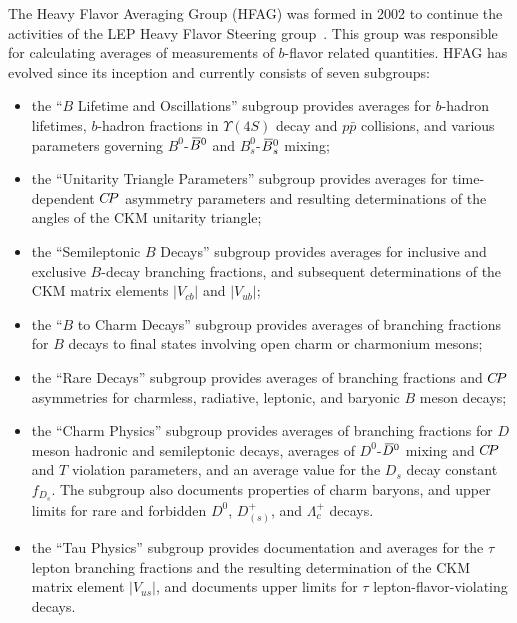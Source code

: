 The Heavy Flavor Averaging Group (HFAG) was formed in 2002 to 
continue the activities of the LEP Heavy Flavor Steering 
group~\cite{Abbaneo:2000ej_mod,*Abbaneo:2001bv_mod_cont}. 
This group was responsible for calculating averages of 
measurements of $b$-flavor related quantities. HFAG has evolved 
since its inception and currently consists of seven subgroups:
% 
\begin{itemize}
\item the ``$B$ Lifetime and Oscillations'' subgroup provides 
averages for $b$-hadron lifetimes, $b$-hadron fractions in 
$\Upsilon(4S)$ decay and $p\bar{p}$ collisions, and various 
parameters governing $B^0$-$\kern 0.18em\overline{\kern -0.18em B}{}^0$ and $B_s^0$-$\kern 0.18em\overline{\kern -0.18em B}{}_s^0$ mixing;

\item the ``Unitarity Triangle Parameters'' subgroup provides
averages for time-dependent $C\!P$ asymmetry parameters and 
resulting determinations of the angles of the CKM unitarity triangle;

\item the ``Semileptonic $B$ Decays'' subgroup provides averages
for inclusive and exclusive $B$-decay branching fractions, and
subsequent determinations of the CKM matrix elements 
$|V_{cb}|$ and $|V_{ub}|$;

\item the ``$B$ to Charm Decays'' subgroup provides averages of 
branching fractions for $B$ decays to final states involving open 
charm or charmonium mesons;

\item the ``Rare Decays'' subgroup provides averages of branching 
fractions and $C\!P$ asymmetries for charmless, radiative, 
leptonic, and baryonic $B$ meson decays;

\item the ``Charm Physics'' subgroup provides averages of branching 
fractions for $D$ meson hadronic and semileptonic decays, 
averages of $D^0$-$\kern 0.2em\overline{\kern -0.2em D}{}^0$ mixing and $C\!P$ and $T$ violation parameters, 
and an average value for the $D^{}_s$ decay constant~$f^{}_{D_s}$.
The subgroup also documents properties of charm baryons, and upper 
limits for rare and forbidden $D^0$, $D^+_{(s)}$, and $\Lambda_c^+$ 
decays.

\item the ``Tau Physics'' subgroup provides documentation and
averages for the $\tau$ lepton branching fractions
and the resulting determination of the CKM matrix element $|V_{us}|$,
and documents upper limits for $\tau$ lepton-flavor-violating decays.
\end{itemize}

